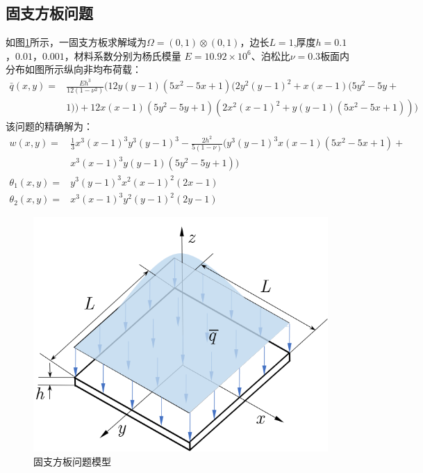 \subsection{固支方板问题}
如图\ref{plate}所示，一固支方板求解域为$\Omega=(0,1)\otimes(0,1)$，边长$L=1$,厚度$h=0.1$，$0.01$，$0.001$，材料系数分别为杨氏模量
$E=10.92\times10^6$、泊松比$\nu=0.3$板面内分布如图所示纵向非均布荷载：
\begin{equation} 
\begin{split} 
    \bar{q}(x,y) =&\frac{Eh^3}{12(1-\nu^2)}(12y(y-1)(5x^2-5x+1)(2y^2(y-1)^2+x(x-1)(5y^2-5y+\\
    &1))+12x(x-1)(5y^2-5y+1)(2x^2(x-1)^2+y(y-1)(5x^2-5x+1)))
\end{split} 
\end{equation}
该问题的精确解为：
\begin{equation} 
    \begin{split} 
        w(x,y) =&\frac{1}{3}x^3(x-1)^3y^3(y-1)^3-\frac{2h^2}{5(1-\nu)}(y^3(y-1)^3x(x-1)(5x^2-5x+1)+\\
        &x^3(x-1)^3y(y-1)(5y^2-5y+1))\\
        \theta_1(x,y) =& y^3(y-1)^3x^2(x-1)^2(2x-1)\\
        \theta_2(x,y) =& x^3(x-1)^3y^2(y-1)^2(2y-1)
    \end{split} 
\end{equation}
\begin{figure}[H]
    \centering 
        \includegraphics[scale=0.8]{figures/shearlocking/plate.png}
        \caption{固支方板问题模型}\label{plate}
\end{figure}
 
